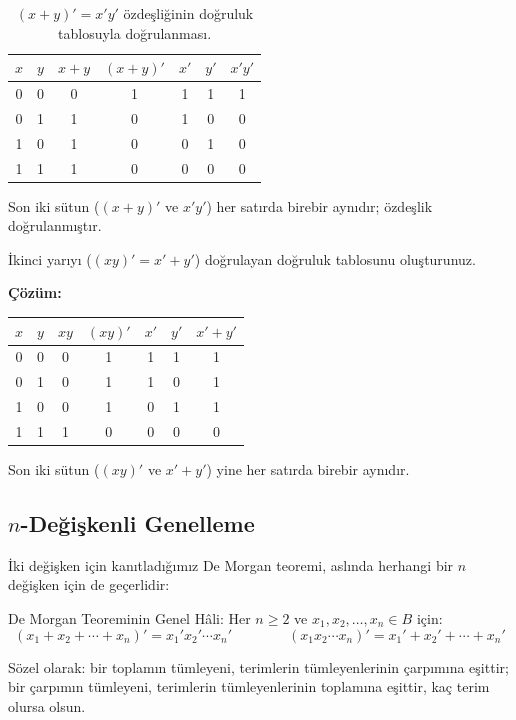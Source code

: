 \begin{table}[H]
\centering
\begin{tabular}{cc|c|c|cc|c}
\toprule
$x$ & $y$ & $x+y$ & $(x+y)'$ & $x'$ & $y'$ & $x'y'$ \\
\midrule
0&0&0&1&1&1&1\\
0&1&1&0&1&0&0\\
1&0&1&0&0&1&0\\
1&1&1&0&0&0&0\\
\bottomrule
\end{tabular}
\caption{$(x+y)'=x'y'$ özdeşliğinin doğruluk tablosuyla doğrulanması.}
\label{tab:demorgan-truth-table}
\end{table}

Son iki sütun ($(x+y)'$ ve $x'y'$) her satırda birebir aynıdır; özdeşlik doğrulanmıştır.

\begin{alistirma}[\kolay]
İkinci yarıyı ($(xy)'=x'+y'$) doğrulayan doğruluk tablosunu oluşturunuz.
\end{alistirma}

\noindent\textbf{Çözüm:}
\begin{center}
\begin{tabular}{cc|c|c|cc|c}
\toprule
$x$ & $y$ & $xy$ & $(xy)'$ & $x'$ & $y'$ & $x'+y'$ \\
\midrule
0&0&0&1&1&1&1\\
0&1&0&1&1&0&1\\
1&0&0&1&0&1&1\\
1&1&1&0&0&0&0\\
\bottomrule
\end{tabular}
\end{center}
Son iki sütun ($(xy)'$ ve $x'+y'$) yine her satırda birebir aynıdır.

\subsection{$n$-Değişkenli Genelleme}
\label{sec:demorgan-n-degiskenli}

İki değişken için kanıtladığımız De Morgan teoremi, aslında herhangi bir $n$ değişken için
de geçerlidir:

\begin{tanim}{De Morgan Teoreminin Genel Hâli:}
Her $n\geq 2$ ve $x_1,x_2,\ldots,x_n\in B$ için:
\[
(x_1+x_2+\cdots+x_n)'=x_1'x_2'\cdots x_n' \qquad\qquad
(x_1x_2\cdots x_n)'=x_1'+x_2'+\cdots+x_n'
\]
\end{tanim}

Sözel olarak: bir toplamın tümleyeni, terimlerin tümleyenlerinin çarpımına eşittir; bir
çarpımın tümleyeni, terimlerin tümleyenlerinin toplamına eşittir, kaç terim olursa olsun.


